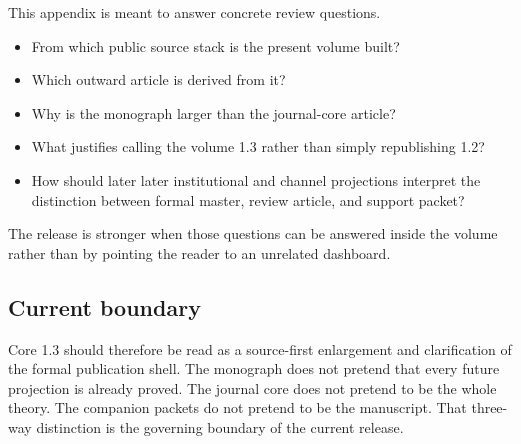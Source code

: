 This appendix is meant to answer concrete review questions.

\begin{itemize}
\item From which public source stack is the present volume built?
\item Which outward article is derived from it?
\item Why is the monograph larger than the journal-core article?
\item What justifies calling the volume 1.3 rather than simply republishing 1.2?
\item How should later later institutional and channel projections interpret the distinction between formal
      master, review article, and support packet?
\end{itemize}

The release is stronger when those questions can be answered inside the volume rather than by
pointing the reader to an unrelated dashboard.

\subsection{Current boundary}

Core 1.3 should therefore be read as a source-first enlargement and clarification of the formal
publication shell.
The monograph does not pretend that every future projection is already proved.
The journal core does not pretend to be the whole theory.
The companion packets do not pretend to be the manuscript.
That three-way distinction is the governing boundary of the current release.
